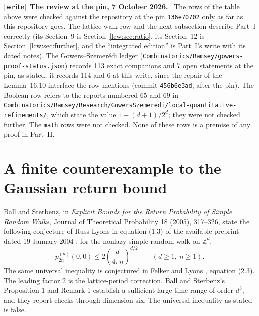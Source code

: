 \documentclass[11pt,letterpaper]{article}
\theoremstyle{remark}\newtheorem{remark}[theorem]{Remark}
\newcommand{\file}[1]{\nolinkurl{#1}}
\newenvironment{writenote}[1][]{\par\smallskip\begingroup\small
 \noindent\textbf{[write]}\if\relax\detokenize{#1}\relax\else~\textbf{#1.}\fi\ }%
 {\par\endgroup\smallskip}
\begin{document}
\begin{writenote}[The review at the pin, 7 October 2026]
The rows of the table above were checked against the repository at the pin
\file{136e70702} only as far as this repository goes. The lattice-walk row
and the next subsection describe Part~I correctly (its Section~9 is
Section~\ref{lcw:sec:ratio}, its Section~12 is Section~\ref{lcw:sec:further},
and the ``integrated edition'' is Part~I's write with its dated notes). The
Gowers--Szemer\'edi ledger
(\file{Combinatorics/Ramsey/gowers-proof-status.json}) records 113 exact
companions and 7 open statements at the pin, as stated; it records 114 and 6
at this write, since the repair of the Lemma~16.10 interface the row
mentions (commit \file{456b6e3ad}, after the pin). The Boolean row refers to the reports numbered 65 and 69 in
\file{Combinatorics/Ramsey/Research/GowersSzemeredi/local-quantitative-refinements/},
which state the value $1-(d+1)/2^d$; they were not checked further. The
\texttt{math} rows were not checked. None of these rows is a premise of any
proof in Part~II.
\end{writenote}


\section{A finite counterexample to the Gaussian return bound}
\label{lcw:ulb:sec:lyons-counterexample}

Ball and Sterbenz, in \emph{Explicit Bounds for the Return Probability
of Simple Random Walks}, Journal of Theoretical Probability 18 (2005),
317--326, state the following conjecture of Russ Lyons in equation (1.3)
of the available preprint dated 19 January 2004 \cite{ballsterbenz}: for the nonlazy simple random walk on $\mathbb Z^d$,
\begin{equation}\label{lcw:ulb:eq:lyons-bound}
 p_{2n}^{(d)}(0,0)\le 2\left(\frac{d}{4\pi n}\right)^{d/2}
 \qquad(d\ge1,\ n\ge1).
\end{equation}
The same universal inequality is conjectured in Felker and Lyons
\cite{felkerlyons}, equation (2.3). The leading factor $2$ is the
lattice-period correction. Ball and Sterbenz's
Proposition 1 and Remark 1 establish a sufficient large-time range
of order $d^3$, and they report checks through dimension six.
The universal inequality as stated is false.
\end{document}
